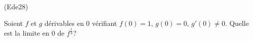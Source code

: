 \begin{tiny}(Ede28)\end{tiny} Soient $f$ et $g$ dérivables en $0$ vérifiant $f(0)=1$, $g(0)=0$, $g'(0)\neq 0$. Quelle est la limite en $0$ de $f^{\frac{1}{g}}$?